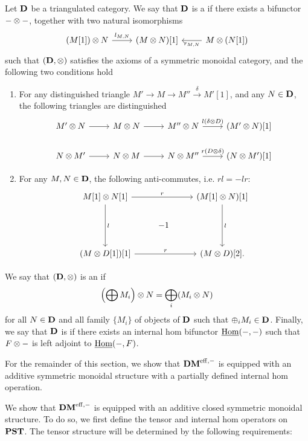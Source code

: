 \begin{defn}
Let $\DCat[D]$ be a triangulated category. We say that $\DCat[D]$ 
is a  if there exists a bifunctor
$- \tensor -$, together with two natural isomorphisms 
\[
\begin{tikzcd}
(M[1]) \tensor N \arrow{r}{l_{M, N}}&
(M \tensor N)[1] &
M \tensor (N[1]) \arrow{l}{r_{M, N}}
\end{tikzcd}
\]
such that $(\DCat[D], \tensor)$ satisfies the axioms of a 
symmetric monoidal category, and the following two conditions
hold
\begin{enumerate}
\item For any distinguished triangle $M' \to M \to M'' 
\stackrel{\delta}{\to} M'[1]$, and any $N \in \DCat[D]$,
the following triangles are distinguished
\[
\begin{tikzcd}
M' \tensor N \arrow{r} &
M \tensor N \arrow{r} &
M'' \tensor N \arrow{r}{l(\delta \tensor D)}&
(M' \tensor N)[1] \\
N \tensor M' \arrow{r} &
N \tensor M \arrow{r} &
N \tensor M'' \arrow{r}{r(D \tensor \delta)}&
(N \tensor M')[1]
\end{tikzcd}
\]

\item For any $M, N \in \DCat[D]$, the following anti-commutes,
i.e. $rl = -lr$:
\[
\begin{tikzcd}
M[1] \tensor N[1] \arrow{rr}{r}\arrow{dd}{l} && 
(M[1] \tensor N)[1] \arrow{dd}{l} \\
& -1 \\
(M \tensor D[1])[1] \arrow{rr}{r} &&
(M \tensor D)[2].
\end{tikzcd}
\]
\end{enumerate}

We say that $(\DCat, \tensor)$ is an  if 
\[
\left(\bigoplus M_i\right) \tensor N = \bigoplus_i (M_i \tensor N)
\]
for all $N \in \DCat$ and all family $\{M_i\}$ of objects of 
$\DCat$ such that $\oplus_i M_i \in \DCat$. Finally, we say that
$\DCat$ is  if there exists an internal hom
bifunctor $\ihom(-,-)$ such that $F \tensor -$ is left adjoint to
$\ihom(-, F)$.
\end{defn}

For the remainder of this section, we show that $\DMeff$ is 
equipped with an additive symmetric monoidal structure with a
partially defined internal hom operation.

We show that $\DMeff$ is equipped with an additive closed 
symmetric monoidal structure. To do so, we first define the tensor 
and internal hom operators on $\PST$. The tensor structure will be 
determined by the following requirements: 

